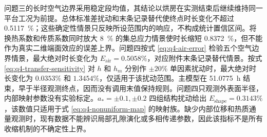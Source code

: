 \documentclass[withoutpreface,bwprint]{cumcmthesis}
\begin{document}
问题三的长时空气边界采用稳定段均值，其结论以烘房在实测结束后继续维持同一平台工况为前提。总体标准差扰动和末条记录替代使终点时长变化不超过 \SI{0.5117}{\percent}；这些确定性情景只反映所设范围内的响应，不构成统计置信区间。将换热系数和传质系数同时放大 \SI{8}{\percent} 的集总应力情景使时长缩短 \SI{0.8372}{\percent}，但不能作为真实二维端面效应的误差上界。问题四按式 \ref{eq:q4-air-error} 检验五个空气边界情景，最大绝对时长变化为 \(E_{\mathrm{air}}=0.5058\%\)，对应附件末条记录替代情景。按式 \ref{eq:q4-transfer-sensitivity} 对 \(h\) 和 \(h_m\) 分别作 \(\pm20\%\) 单因素扰动时，最大绝对时长变化为 \(0.0353\%\) 和 \(1.3454\%\)，仅适用于该扰动范围。主模型在 \SI{51.0775}{h} 结束，早于半径观测终点，因而没有调用末值保持规则。问题四只观测外表面半径，内部映射参数没有实验标定。\(a_*=\pm0.1,\pm0.2\) 四组结构扰动给出 \(E_{\mathrm{shape}}=0.3143\%\)，该数值只适用于式 \ref{eq:q4-nonuniform-map} 的映射族。缺少内部位移和热质通量观测时，现有数据不能辨识局部孔隙演化或多相传递参数，因此该指标不是所有收缩机制的不确定性上界。

\end{document}
